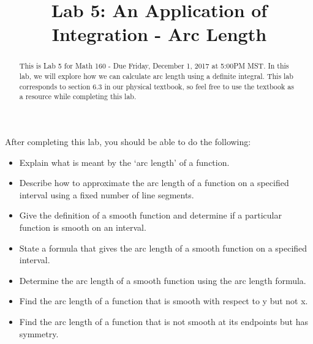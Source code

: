 \documentclass{ximera}
\title{Lab 5: An Application of Integration - Arc Length}
\begin{document}
\begin{abstract}
This is Lab 5 for Math 160 - Due Friday, December 1, 2017 at 5:00PM MST.  In this lab, we will explore how we can calculate arc length using a definite integral.  This lab corresponds to section 6.3 in our physical textbook, so feel free to use the textbook as a resource while completing this lab.\\
\end{abstract}

\maketitle

\begin{sectionOutcomes}

After completing this lab, you should be able to do the following: 

\begin{itemize}
\item Explain what is meant by the `arc length' of a function.
\item Describe how to approximate the arc length of a function on a specified interval using a fixed number of line segments.
\item Give the definition of a smooth function and determine if a particular function is smooth on an interval.
\item State a formula that gives the arc length of a smooth function on a specified interval. 
\item Determine the arc length of a smooth function using the arc length formula.
\item Find the arc length of a function that is smooth with respect to y but not x.
\item Find the arc length of a function that is not smooth at its endpoints but has symmetry. 
\end{itemize}

\end{sectionOutcomes}
\end{document}
